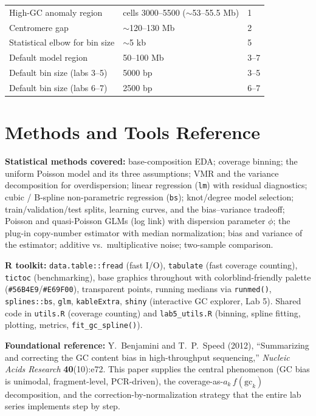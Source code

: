 \documentclass[11pt]{article}
\newcommand{\code}[1]{\texttt{#1}}
\begin{document}
\begin{center}
\begin{tabular}{@{}lll@{}}
\midrule
High-GC anomaly region                         & cells 3000--5500 ($\sim$53--55.5 Mb) & 1 \\
Centromere gap                                 & $\sim$120--130 Mb          & 2 \\
Statistical elbow for bin size                 & $\sim$5 kb                 & 5 \\
Default model region                           & 50--100 Mb                 & 3--7 \\
Default bin size (labs 3--5)                   & 5000 bp                    & 3--5 \\
Default bin size (labs 6--7)                   & 2500 bp                    & 6--7 \\
\bottomrule
\end{tabular}
\end{center}

\section{Methods and Tools Reference}

\textbf{Statistical methods covered:}
base-composition EDA; coverage binning; the uniform Poisson model and its three
assumptions; VMR and the variance decomposition for overdispersion; linear regression
(\code{lm}) with residual diagnostics; cubic / B-spline non-parametric regression
(\code{bs}); knot/degree model selection; train/validation/test splits, learning
curves, and the bias--variance tradeoff; Poisson and quasi-Poisson GLMs (log link)
with dispersion parameter $\phi$; the plug-in copy-number estimator with median
normalization; bias and variance of the estimator; additive vs.\ multiplicative noise;
two-sample comparison.

\textbf{R toolkit:}
\code{data.table::fread} (fast I/O), \code{tabulate} (fast coverage counting),
\code{tictoc} (benchmarking), base graphics throughout with colorblind-friendly palette
(\code{\#56B4E9}/\code{\#E69F00}), transparent points, running medians via \code{runmed()},
\code{splines::bs}, \code{glm}, \code{kableExtra}, \code{shiny} (interactive GC explorer,
Lab 5). Shared code in \code{utils.R} (coverage counting) and \code{lab5\_utils.R}
(binning, spline fitting, plotting, metrics, \code{fit\_gc\_spline()}).

\textbf{Foundational reference:}
Y.~Benjamini and T.~P.~Speed (2012), ``Summarizing and correcting the GC content bias
in high-throughput sequencing,'' \textit{Nucleic Acids Research} \textbf{40}(10):e72.
This paper supplies the central phenomenon (GC bias is unimodal, fragment-level,
PCR-driven), the coverage-as-$a_k\,f(\text{gc}_k)$ decomposition, and the
correction-by-normalization strategy that the entire lab series implements step by step.
\end{document}

